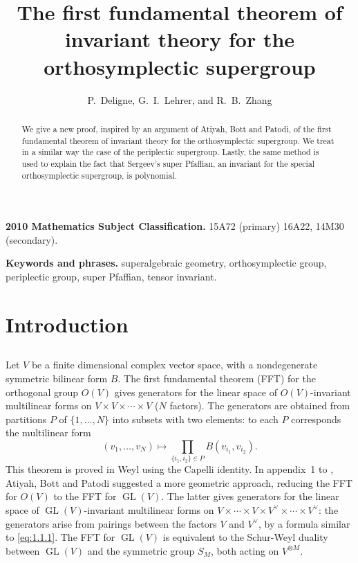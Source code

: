 \documentclass[11pt,a4paper]{article}
\title{The first fundamental theorem of invariant theory for the orthosymplectic supergroup}
\author{P.~Deligne, G.~I.~Lehrer, and R.~B.~Zhang}
\date{}
\theoremstyle{plain}
\theoremstyle{definition}
\DeclareMathOperator{\GL}{GL}
\begin{document}
\maketitle

\begin{abstract}
We give a new proof, inspired by an argument of Atiyah, Bott and Patodi, of the first fundamental theorem of invariant theory for the orthosymplectic supergroup. We treat in a similar way the case of the periplectic supergroup. Lastly, the same method is used to explain the fact that Sergeev's super Pfaffian, an invariant for the special orthosymplectic supergroup, is polynomial.
\end{abstract}

\noindent\textbf{2010 Mathematics Subject Classification.} 15A72 (primary) 16A22, 14M30 (secondary).

\smallskip
\noindent\textbf{Keywords and phrases.} superalgebraic geometry, orthosymplectic group, periplectic group, super Pfaffian, tensor invariant.

\tableofcontents

\section{Introduction}

\subsection{}
Let $V$ be a finite dimensional complex vector space, with a nondegenerate symmetric bilinear form $B$. The first fundamental theorem (FFT) for the orthogonal group $O(V)$ gives generators for the linear space of $O(V)$-invariant multilinear forms on $V \times V \times \cdots \times V$ ($N$ factors). The generators are obtained from partitions $P$ of $\{1,\dots,N\}$ into subsets with two elements: to each $P$ corresponds the multilinear form
\begin{equation}\label{eq:1.1.1}
(v_1, \dots, v_N) \mapsto \prod_{\{i_1, i_2\} \in P} B(v_{i_1}, v_{i_2}).
\end{equation}
This theorem is proved in Weyl \cite{Weyl46} using the Capelli identity. In appendix~1 to \cite{ABP73}, Atiyah, Bott and Patodi suggested a more geometric approach, reducing the FFT for $O(V)$ to the FFT for $\GL(V)$. The latter gives generators for the linear space of $\GL(V)$-invariant multilinear forms on $V \times \cdots \times V \times V^\vee \times \cdots \times V^\vee$: the generators arise from pairings between the factors $V$ and $V^\vee$, by a formula similar to \eqref{eq:1.1.1}. The FFT for $\GL(V)$ is equivalent to the Schur-Weyl duality between $\GL(V)$ and the symmetric group $S_M$, both acting on $V^{\otimes M}$.
\end{document}

